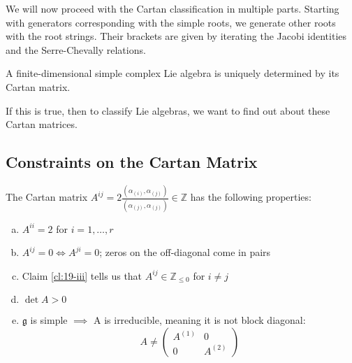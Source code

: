 We will now proceed with the Cartan classification in multiple parts.
Starting with generators corresponding with the simple roots, we generate other roots with the root strings. Their brackets are given by iterating the Jacobi identities and the Serre-Chevally relations.

\begin{claim}
  A finite-dimensional simple complex Lie algebra is uniquely determined by its Cartan matrix.
\end{claim}
If this is true, then to classify Lie algebras, we want to find out about these Cartan matrices.

\subsection{Constraints on the Cartan Matrix}%
\label{sub:constraints_on_cartan_matrix}

The Cartan matrix $ A^{ij} = 2\frac{(\alpha_{(i)}, \alpha_{(j)})}{(\alpha_{(j)}, \alpha_{(j)})} \in \mathbb{Z} $ has the following properties:
\begin{enumerate}[a)]
  \item $A^{ii} = 2$ for $i = 1, \dots, r$
  \item $A^{ij} = 0 \iff A^{ji} = 0$; zeros on the off-diagonal come in pairs
  \item Claim \ref{cl:19-iii} tells us that $A^{ij} \in \mathbb{Z}_{\leq 0}$ for $i \neq j$
  \item $\det A > 0$
  \item $\mathfrak{g}$ is simple $\implies$ A is irreducible, meaning it is not block diagonal:
    \begin{equation}
      A \neq 
      \begin{pmatrix}
      A^{(1)} & 0 \\
      0 & A^{(2)}
      \end{pmatrix}
    \end{equation}
\end{enumerate}

